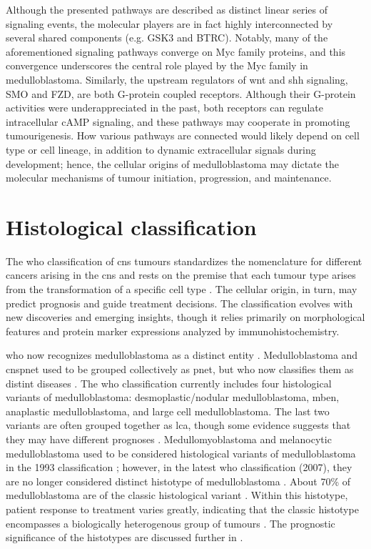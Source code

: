 Although the presented pathways are described as distinct linear series of signaling events, the molecular players are in fact highly interconnected by several shared components (e.g. GSK3 and BTRC). Notably, many of the aforementioned signaling pathways converge on Myc family proteins, and this convergence underscores the central role played by the Myc family in medulloblastoma. Similarly, the upstream regulators of \gls{wnt} and \gls{shh} signaling, SMO and FZD, are both G-protein coupled receptors. Although their G-protein activities were underappreciated in the past, both receptors can regulate intracellular cAMP signaling, and these pathways may cooperate in promoting tumourigenesis. How various pathways are connected would likely depend on cell type or cell lineage, in addition to dynamic extracellular signals during development; hence, the cellular origins of medulloblastoma may dictate the molecular mechanisms of tumour initiation, progression, and maintenance.


\section{Histological classification}

The \gls{who} classification of \gls{cns} tumours standardizes the nomenclature for different cancers arising in the \gls{cns} and rests on the premise that each tumour type arises from the transformation of a specific cell type . The cellular origin, in turn, may predict prognosis and guide treatment decisions. The classification evolves with new discoveries and emerging insights, though it relies primarily on morphological features and protein marker expressions analyzed by immunohistochemistry.

\gls{who} now recognizes medulloblastoma as a distinct entity . Medulloblastoma and \gls{cnspnet} used to be grouped collectively as \gls{pnet}, but \gls{who} now classifies them as distint diseases . The \gls{who} classification currently includes four histological variants of medulloblastoma: desmoplastic/nodular medulloblastoma, \gls{mben}, anaplastic medulloblastoma, and large cell medulloblastoma. The last two variants are often grouped together as \gls{lca}, though some evidence suggests that they may have different prognoses . Medullomyoblastoma and melanocytic medulloblastoma used to be considered histological variants of medulloblastoma in the 1993 classification ; however, in the latest \gls{who} classification (2007), they are no longer considered distinct histotype of medulloblastoma . About 70\% of medulloblastoma are of the classic histological variant . Within this histotype, patient response to treatment varies greatly, indicating that the classic histotype encompasses a biologically heterogenous group of tumours . The prognostic significance of the histotypes are discussed further in .

